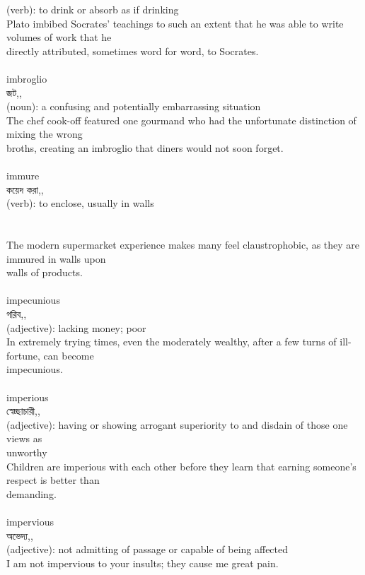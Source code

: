 \documentclass{article}
\begin{document}
{{(verb): to drink or absorb as if drinking\\Plato imbibed Socrates' teachings to such an extent that he was able to write volumes of work that he\\directly attributed, sometimes word for word, to Socrates.\\}\\
{imbroglio}\\
{জট,,}\\
{(noun): a confusing and potentially embarrassing situation\\The chef cook-off featured one gourmand who had the unfortunate distinction of mixing the wrong\\broths, creating an imbroglio that diners would not soon forget.\\}\\
{immure}\\
{কয়েদ করা,,}\\
{(verb): to enclose, usually in walls\\\\                                                                               \\The modern supermarket experience makes many feel claustrophobic, as they are immured in walls upon\\walls of products.\\}\\
{impecunious}\\
{গরিব,,}\\
{(adjective): lacking money; poor\\In extremely trying times, even the moderately wealthy, after a few turns of ill-fortune, can become\\impecunious.\\}\\
{imperious}\\
{স্বেচ্ছাচারী,,}\\
{(adjective): having or showing arrogant superiority to and disdain of those one views as\\unworthy\\Children are imperious with each other before they learn that earning someone's respect is better than\\demanding.\\}\\
{impervious}\\
{অভেদ্য,,}\\
{(adjective): not admitting of passage or capable of being affected\\I am not impervious to your insults; they cause me great pain.\\}\\
}
\end{document}
